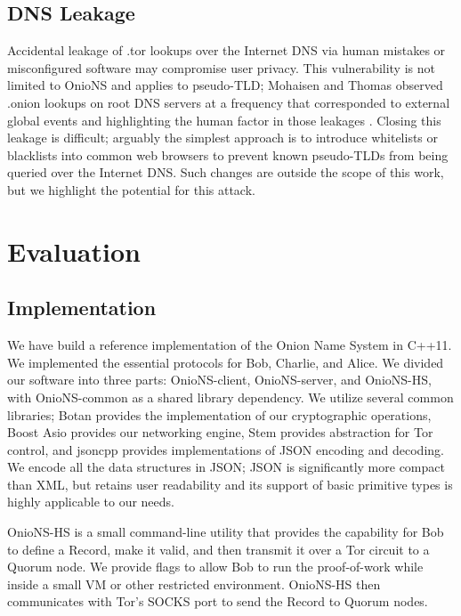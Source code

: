 \documentclass[USenglish,oneside,twocolumn]{article}
\begin{document}
\subsection{DNS Leakage}

Accidental leakage of .tor lookups over the Internet DNS via human mistakes or misconfigured software may compromise user privacy. This vulnerability is not limited to OnioNS and applies to pseudo-TLD; Mohaisen and Thomas observed .onion lookups on root DNS servers at a frequency that corresponded to external global events and highlighting the human factor in those leakages \cite{thomasmeasuring}. Closing this leakage is difficult; arguably the simplest approach is to introduce whitelists or blacklists into common web browsers to prevent known pseudo-TLDs from being queried over the Internet DNS. Such changes are outside the scope of this work, but we highlight the potential for this attack.

\section{Evaluation}
\label{sec:Evaluation}

\subsection{Implementation}

We have build a reference implementation of the Onion Name System in C++11. We implemented the essential protocols for Bob, Charlie, and Alice. We divided our software into three parts: OnioNS-client, OnioNS-server, and OnioNS-HS, with OnioNS-common as a shared library dependency. We utilize several common libraries; Botan \cite{BotanLib} provides the implementation of our cryptographic operations, Boost Asio \cite{AsioLib} provides our networking engine, Stem provides abstraction for Tor control, and jsoncpp \cite{JsonCppLib} provides implementations of JSON encoding and decoding. We encode all the data structures in JSON; JSON is significantly more compact than XML, but retains user readability and its support of basic primitive types is highly applicable to our needs. 

OnioNS-HS is a small command-line utility that provides the capability for Bob to define a Record, make it valid, and then transmit it over a Tor circuit to a Quorum node. We provide flags to allow Bob to run the proof-of-work while inside a small VM or other restricted environment. OnioNS-HS then communicates with Tor's SOCKS port to send the Record to Quorum nodes.
\end{document}
